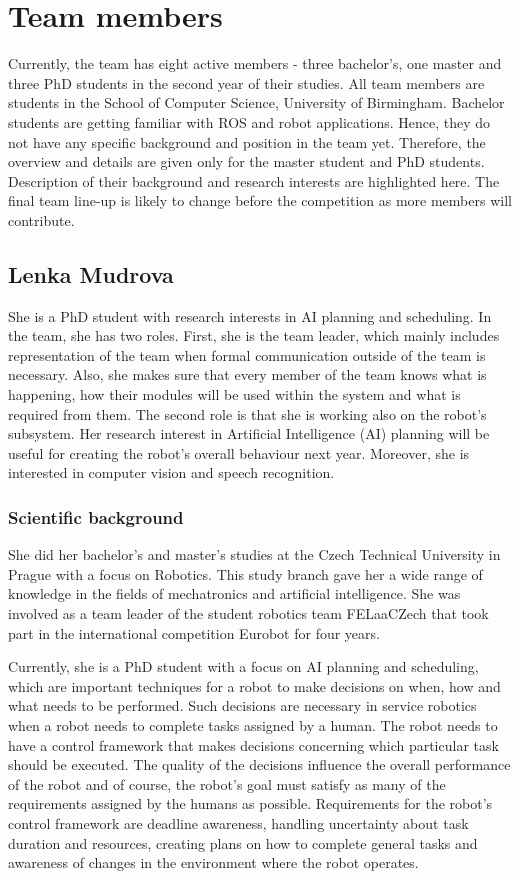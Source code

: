 
\section{Team members}
Currently, the team has eight active members - three bachelor's, one master and three PhD students in the second year of their studies. All team members are students in the School of Computer Science, University of Birmingham. 
Bachelor students are getting familiar with ROS and robot applications. Hence, they do not have any specific background and position in the team yet.
Therefore, the overview and details are given only for the master student and PhD students. Description of their background and research interests are highlighted here. The final team line-up is likely to change before the competition as more members will contribute.

\subsection{Lenka Mudrova}

She is a PhD student with research interests in AI planning and scheduling. In the team, she has two roles. First, she is the team leader, which mainly includes representation of the team when formal communication outside of the team is necessary. Also, she makes sure that every member of the team knows what is happening, how their modules will be used within the system and what is required from them. The second role is that she is working also on the robot's subsystem. Her research interest in Artificial Intelligence (AI) planning will be useful for creating the robot's overall behaviour next year. Moreover, she is interested in computer vision and speech recognition.

\subsubsection*{Scientific background}
She did her bachelor's and master's studies at the Czech Technical University in Prague with a focus on Robotics. This study branch gave her a wide range of knowledge in the fields of mechatronics and artificial intelligence. She was involved as a team leader of the student robotics team FELaaCZech that took part in the international competition Eurobot for four years. 

Currently, she is a PhD student with a focus on AI planning and scheduling, which are important techniques for a robot to make decisions on when, how and what needs to be performed. Such decisions are necessary in service robotics when a robot needs to complete tasks assigned by a human. The robot needs to have a control framework that makes decisions concerning which particular task should be executed. The quality of the decisions influence the overall performance of the robot and of course, the robot's goal must satisfy as many of the requirements assigned by the humans as possible. Requirements for the robot's control framework are deadline awareness, handling uncertainty about task duration and resources, creating plans on how to complete general tasks and awareness of changes in the environment where the robot operates. 

